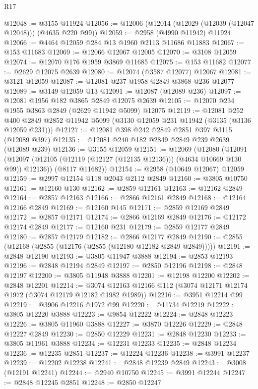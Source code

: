 \begin{lexlean}{R17}
\begin{coremodule}
@12048 := @3155 @11924
@12056 := @12006 (@12014 (@12029 (@12039 (@12047 @12048))) (@4635 @220 @99))
@12059 := @2958 (@4990 @11942) @11924
@12066 := @4464 @12059 @284 @13 @1960 @2113 @11686 @11883
@12067 := @153 @11683
@12069 := @12066 @12067 @12005
@12070 := @3108 @12059
@12074 := @12070 @176 @1959 @3869 @11685
@12075 := @153 @11682
@12077 := @2629 @12075 @2639
@12080 := @12074 (@3587 @12077) @12067
@12081 := @3121 @12059
@12087 := @12081 @237 @1958 @2849 @3868 @236 @12077
@12089 := @3149 @12059 @13
@12091 := @12087 (@12089 @236)
@12097 := @12081 @1956 @182 @3865 @2849 @12075 @2639
@12105 := @12070 @234 @1955 @3863 @2849 (@2629 @11942 @5099) @12075
@12119 := @12081
    @252
    @400
    @2849
    @2852
    @11942
    @5099
    (@3130 @12059 @231 @11942 (@3135 (@3136 @12059 @231)))
@12127 := @12081 @398 @242 @2849 @2851 @397 @3115 (@12089 @397)
@12135 := @12081 @240 @182 @2849 @2849 @239 @2639 (@12089 @239)
@12136 := @3155 @12059
@12151 := @12069
    (@12080
      (@12091 (@12097 (@12105 (@12119 (@12127 (@12135 @12136))) (@4634 @10669 @130 @99)) @12136))
      (@8117 @11682))
@12154 := @2958 (@10649 @12067) @12059
@12159 := @2997 @12154 @118 @2043 @2112 @2849
@12160 := @3805 @10750
@12161 := @12160 @130
@12162 := @2859 @12161
@12163 := @12162 @2849
@12164 := @2857 @12163
@12166 := @2866 @12161 @2849
@12168 := @12164 @12166 @2849
@12169 := @12160 @145
@12171 := @2859 @12169 @2849
@12172 := @2857 @12171
@12174 := @2866 @12169 @2849
@12176 := @12172 @12174 @2849
@12177 := @12160 @231
@12179 := @2859 @12177 @2849
@12180 := @2857 @12179
@12182 := @2866 @12177 @2849
@12190 := @2855 (@12168 (@2855 (@12176 (@2855 (@12180 @12182 @2849 @2849)))))
@12191 := @2848 @12190
@12193 := @3805 @11947 @3888
@12194 := @2853 @12193
@12196 := @2848 @12194 @2849
@12197 := @2850 @12196
@12198 := @2848 @12197
@12200 := @3805 @11948 @3888
@12201 := @12198 @12200
@12202 := @2848 @12201
@12214 := @3074 @12163 @12166 @112 (@3074 @12171 @12174 @1972 (@3074 @12179 @12182 @1982 @1989))
@12216 := @3951 @12214 @99
@12219 := @3906 @12216 @1972 @99
@12220 := @11734 @12219
@12222 := @3805 @12220 @3888
@12223 := @9854 @12222
@12224 := @2848 @12223
@12226 := @3805 @11960 @3888
@12227 := @3870 @12226
@12229 := @2848 @12227 @2849
@12230 := @2850 @12229
@12231 := @2848 @12230
@12233 := @3805 @11961 @3888
@12234 := @12231 @12233
@12235 := @2848 @12234
@12236 := @12235 @2851
@12237 := @12224 @12236
@12238 := @3991 @12237
@12239 := @12202 @12238
@12241 := @2848 @12239 @2849
@12243 := @3008 (@12191 @12241)
@12244 := @2940 @10750
@12245 := @3991 @12244
@12247 := @2848 @12245 @2851
@12248 := @2850 @12247

\end{coremodule}
\end{lexlean}
